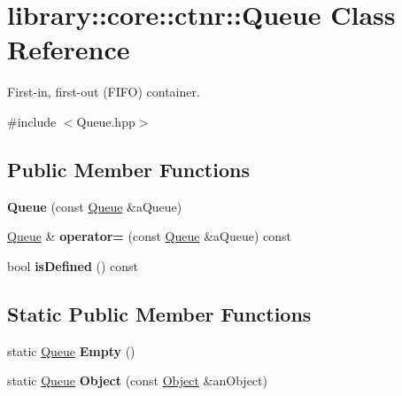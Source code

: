 \hypertarget{classlibrary_1_1core_1_1ctnr_1_1_queue}{}\section{library\+:\+:core\+:\+:ctnr\+:\+:Queue Class Reference}
\label{classlibrary_1_1core_1_1ctnr_1_1_queue}


First-\/in, first-\/out (F\+I\+FO) container.  




{\ttfamily \#include $<$Queue.\+hpp$>$}

\subsection*{Public Member Functions}
\begin{DoxyCompactItemize}
\item 
\mbox{\label{classlibrary_1_1core_1_1ctnr_1_1_queue_a094aaaf1310907f566499e88c932254e}} 
{\bfseries Queue} (const \hyperlink{classlibrary_1_1core_1_1ctnr_1_1_queue}{Queue} \&a\+Queue)
\item 
\mbox{\label{classlibrary_1_1core_1_1ctnr_1_1_queue_aba0855fb48d4cdd3fafc7dc953786de2}} 
\hyperlink{classlibrary_1_1core_1_1ctnr_1_1_queue}{Queue} \& {\bfseries operator=} (const \hyperlink{classlibrary_1_1core_1_1ctnr_1_1_queue}{Queue} \&a\+Queue) const
\item 
\mbox{\label{classlibrary_1_1core_1_1ctnr_1_1_queue_a5bd7d7bd4928ca48a5737815949cf9da}} 
bool {\bfseries is\+Defined} () const
\end{DoxyCompactItemize}
\subsection*{Static Public Member Functions}
\begin{DoxyCompactItemize}
\item 
\mbox{\label{classlibrary_1_1core_1_1ctnr_1_1_queue_a907c38d01188f55feee3bb6614c68af4}} 
static \hyperlink{classlibrary_1_1core_1_1ctnr_1_1_queue}{Queue} {\bfseries Empty} ()
\item 
\mbox{\label{classlibrary_1_1core_1_1ctnr_1_1_queue_a096b1c3bac573745adb88edcbdfbbb95}} 
static \hyperlink{classlibrary_1_1core_1_1ctnr_1_1_queue}{Queue} {\bfseries Object} (const \hyperlink{classlibrary_1_1core_1_1ctnr_1_1_object}{Object} \&an\+Object)
\end{DoxyCompactItemize}
